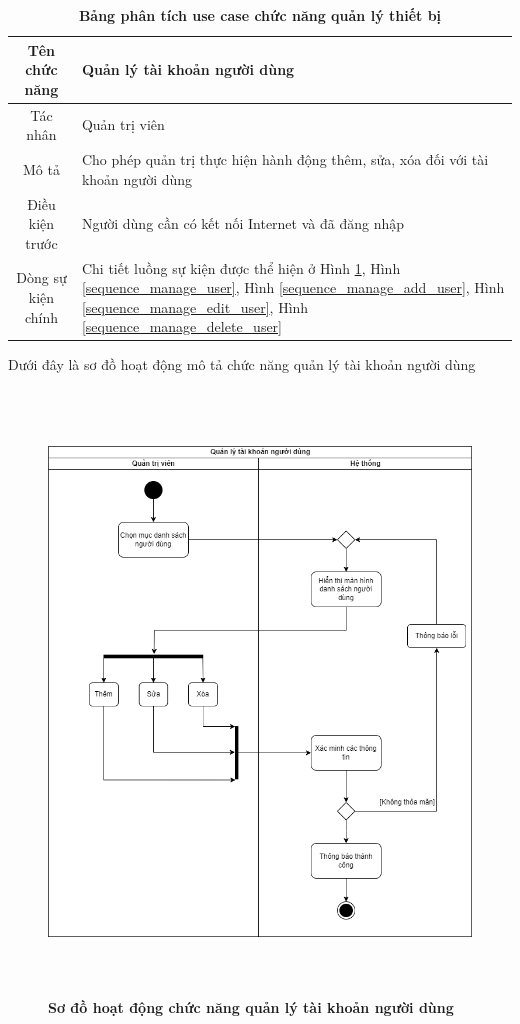   \begin{table}[H]
    \caption{\bfseries \fontsize{12pt}{0pt}\selectfont Bảng phân tích use case chức năng quản lý thiết bị}
    \centering
    \begin{tabularx}{0.9\textwidth}{|c|X|}
      \hline
      \textbf{Tên chức năng} & \textbf{Quản lý tài khoản người dùng} \\
      \hline
      Tác nhân & Quản trị viên \\
      \hline
      Mô tả & Cho phép quản trị thực hiện hành động thêm, sửa, xóa đối với tài khoản người dùng \\
      \hline
      Điều kiện trước & Người dùng cần có kết nối Internet và đã đăng nhập \\
      \hline
      Dòng sự kiện chính & 
        Chi tiết luồng sự kiện được thể hiện ở Hình \ref{activity_user_management}, Hình \ref{sequence_manage_user}, 
        Hình \ref{sequence_manage_add_user}, Hình \ref{sequence_manage_edit_user}, Hình \ref{sequence_manage_delete_user} 
        \\
      \hline
    \end{tabularx}
  \end{table}
  Dưới đây là sơ đồ hoạt động mô tả chức năng quản lý tài khoản người dùng
  \begin{figure}[H]
    \centering
    \includegraphics[width=13.5cm,height=16cm]{Images/acitivity/activity_manage_user.png}
    \caption[Sơ đồ hoạt động chức năng quản lý tài khoản người dùng]{\bfseries \fontsize{12pt}{0pt}
    \selectfont Sơ đồ hoạt động chức năng quản lý tài khoản người dùng}
    \label{activity_user_management} %
  \end{figure}

